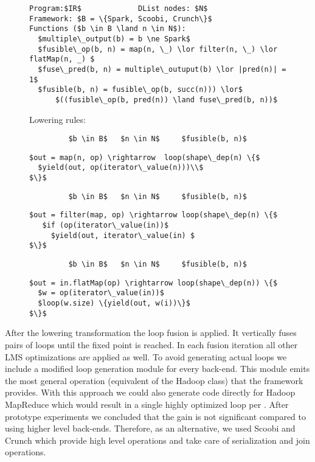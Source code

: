 \begin{figure}
\begin{lstlisting}
Program:$IR$             DList nodes: $N$  
Framework: $B = \{Spark, Scoobi, Crunch\}$ 
Functions ($b \in B \land n \in N$): 
  $multiple\_output(b) = b \ne Spark$
  $fusible\_op(b, n) = map(n, \_) \lor filter(n, \_) \lor flatMap(n, _) $
  $fuse\_pred(b, n) = multiple\_outuput(b) \lor |pred(n)| = 1$ 
  $fusible(b, n) = fusible\_op(b, succ(n))) \lor$
      $((fusible\_op(b, pred(n)) \land fuse\_pred(b, n))$
\end{lstlisting}


Lowering rules:
\begin{lstlisting}
         $b \in B$   $n \in N$     $fusible(b, n)$
\end{lstlisting} 
\vspace{-5pt}{\hspace{0mm}\rule{0.99\columnwidth}{0.25pt}}
\begin{lstlisting}
$out = map(n, op) \rightarrow  loop(shape\_dep(n) \{$
  $yield(out, op(iterator\_value(n)))\\$
$\}$
\end{lstlisting} 
\begin{lstlisting}
         $b \in B$   $n \in N$     $fusible(b, n)$
\end{lstlisting} 
\begin{lstlisting}
$out = filter(map, op) \rightarrow loop(shape\_dep(n) \{$
   $if (op(iterator\_value(in))$
     $yield(out, iterator\_value(in) $
$\}$
\end{lstlisting}
\begin{lstlisting}
         $b \in B$   $n \in N$     $fusible(b, n)$
\end{lstlisting} 
\begin{lstlisting}
$out = in.flatMap(op) \rightarrow loop(shape\_dep(n)) \{$
  $w = op(iterator\_value(in))$
  $loop(w.size) \{yield(out, w(i))\}$
$\}$
\end{lstlisting}
\end{figure}


After the lowering transformation the loop fusion is applied. It vertically fuses pairs of loops until the fixed point is reached. In each fusion iteration all other LMS optimizations are applied as well. To avoid generating actual  loops we include a modified loop generation module for every back-end. This module emits the most general operation (equivalent of the Hadoop  class) that the framework provides. With this approach we could also generate code directly for Hadoop MapReduce which would result in a single highly optimized loop per . After prototype experiments we concluded that the gain is not significant compared to using higher level back-ends. Therefore, as an alternative, we used Scoobi and Crunch which provide high level operations and take care of serialization and join operations.    


